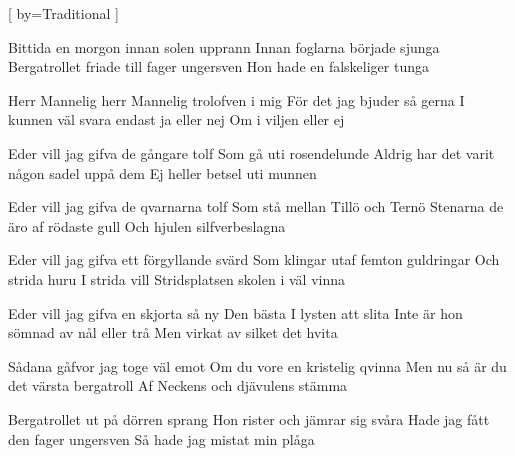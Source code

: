 [
  by={Traditional}
]

\beginverse
Bittida en morgon innan solen upprann
Innan foglarna började sjunga
Bergatrollet friade till fager ungersven
Hon hade en falskeliger tunga
\endverse

\beginchorus
Herr Mannelig herr Mannelig trolofven i mig
För det jag bjuder så gerna
I kunnen väl svara endast ja eller nej
Om i viljen eller ej
\endchorus

\beginverse
Eder vill jag gifva de gångare tolf
Som gå uti rosendelunde
Aldrig har det varit någon sadel uppå dem
Ej heller betsel uti munnen
\endverse

\beginverse
Eder vill jag gifva de qvarnarna tolf
Som stå mellan Tillö och Ternö
Stenarna de äro af rödaste gull
Och hjulen silfverbeslagna
\endverse

\beginverse
Eder vill jag gifva ett förgyllande svärd
Som klingar utaf femton guldringar
Och strida huru I strida vill
Stridsplatsen skolen i väl vinna
\endverse

\beginverse
Eder vill jag gifva en skjorta så ny
Den bästa I lysten att slita
Inte är hon sömnad av nål eller trå
Men virkat av silket det hvita
\endverse

\beginverse
Sådana gåfvor jag toge väl emot
Om du vore en kristelig qvinna
Men nu så är du det värsta bergatroll
Af Neckens och djävulens stämma
\endverse

\beginverse
Bergatrollet ut på dörren sprang
Hon rister och jämrar sig svåra
Hade jag fått den fager ungersven
Så hade jag mistat min plåga
\endverse

\endsong
